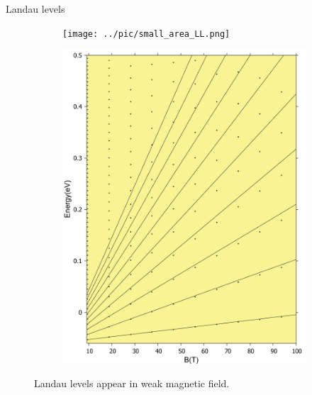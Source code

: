 \documentclass[aspectratio=169,compress,x11names]{beamer}
\begin{document}
	\begin{frame}{Landau levels}
		\begin{figure}
			\centering
			\begin{subfigure}[b]{0.49\textwidth}
				\centering
				{\texttt{[image: ../pic/small\_area\_LL.png]}}
			\end{subfigure}
			\hspace{-3\baselineskip}
			\begin{subfigure}[b]{0.49\textwidth}
				\centering
				\includegraphics[width=0.6\linewidth]{../pic/landaulevel_h0_q_797.pdf}
			\end{subfigure}
			\caption{
				Landau levels appear in weak magnetic field.
			}
		\end{figure}
	\end{frame}
\end{document}
